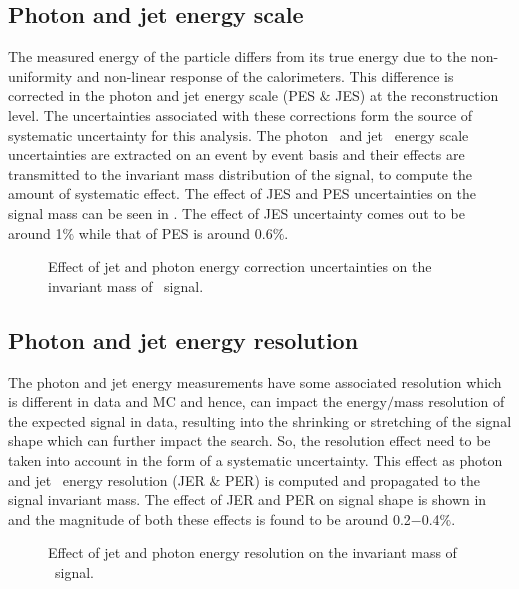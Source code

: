 \subsection{Photon and jet energy scale}
The measured energy of the particle differs from its true energy due to the non-uniformity and non-linear response of the calorimeters. 
This difference is corrected in the photon and jet energy scale (PES $\&$ JES) at the reconstruction level. The uncertainties associated with these corrections
form the source of systematic uncertainty for this analysis. The photon~\cite{Chatrchyan:2013dga} and jet~\cite{Chatrchyan:2011ds}
energy scale uncertainties are extracted on an event by event basis and
their effects are transmitted to the invariant mass distribution of the signal, to compute the amount of systematic effect.
The effect of JES and PES uncertainties on the signal mass can be seen in \fig{\ref{fig:JESsys}}. The effect of JES uncertainty comes out to be around 1$\%$ while
that of PES is around 0.6$\%$.

\begin{figure}[htbp]
\centering
{} \hspace{0.2in}
\caption{Effect of jet and photon energy correction uncertainties on the invariant mass of \qstar\ signal.}
\label{fig:JESsys}
\end{figure}

\subsection{Photon and jet energy resolution}
The photon and jet energy measurements have some associated resolution which is different in data and MC and hence, can impact the energy$/$mass
resolution of the expected signal in data, resulting into the shrinking or stretching of the signal shape which can further impact the search.
So, the resolution effect need to be taken into account in the form of a systematic uncertainty. This effect as photon~\cite{Chatrchyan:2013dga} and
jet~\cite{Chatrchyan:2011ds} energy resolution (JER $\&$ PER) is computed and
propagated to the signal invariant mass. The effect of JER and PER on signal shape is shown in \fig{\ref{fig:PESsys}}
and the magnitude of both these effects is found to be around 0.2$-$0.4$\%$.
\vspace{-0.2in}
\begin{figure}[htbp]
\centering
{} \hspace{0.2in}
\caption{Effect of jet and photon energy resolution on the invariant mass of \qstar\ signal.}
\label{fig:PESsys}
\end{figure}
\vspace{-0.2in}

